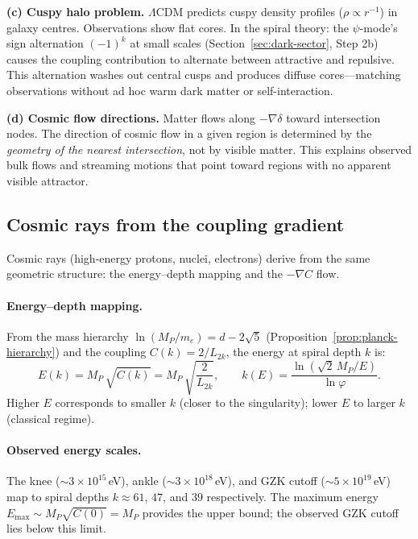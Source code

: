 \documentclass[12pt,a4paper]{article}
\begin{document}
\textbf{(c) Cuspy halo problem.} $\Lambda$CDM predicts cuspy density profiles ($\rho \propto r^{-1}$) in galaxy centres.  Observations show flat cores.  In the spiral theory: the $\psi$-mode's sign alternation $(-1)^k$ at small scales (Section~\ref{sec:dark-sector}, Step 2b) causes the coupling contribution to alternate between attractive and repulsive.  This alternation washes out central cusps and produces diffuse cores---matching observations without ad hoc warm dark matter or self-interaction.

\textbf{(d) Cosmic flow directions.} Matter flows along $-\nabla\delta$ toward intersection nodes. The direction of cosmic flow in a given region is determined by the \emph{geometry of the nearest intersection}, not by visible matter. This explains observed bulk flows and streaming motions that point toward regions with no apparent visible attractor.

\subsection{Cosmic rays from the coupling gradient}
\label{sec:cosmic-rays}

Cosmic rays (high-energy protons, nuclei, electrons) derive from the same geometric structure: the energy--depth mapping and the $-\nabla C$ flow.

\paragraph{Energy--depth mapping.}
From the mass hierarchy $\ln(M_P/m_e) = d - 2\sqrt{5}$ (Proposition~\ref{prop:planck-hierarchy}) and the coupling $C(k) = 2/L_{2k}$, the energy at spiral depth $k$ is:
\begin{equation}
E(k) = M_P\,\sqrt{C(k)} = M_P\,\sqrt{\frac{2}{L_{2k}}}, \qquad k(E) = \frac{\ln(\sqrt{2}\,M_P/E)}{\ln\varphi}.
\end{equation}
Higher $E$ corresponds to smaller $k$ (closer to the singularity); lower $E$ to larger $k$ (classical regime).

\paragraph{Observed energy scales.}
The knee ($\sim 3\times 10^{15}$\,eV), ankle ($\sim 3\times 10^{18}$\,eV), and GZK cutoff ($\sim 5\times 10^{19}$\,eV) map to spiral depths $k \approx 61$, $47$, and $39$ respectively. The maximum energy $E_{\max} \sim M_P\sqrt{C(0)} = M_P$ provides the upper bound; the observed GZK cutoff lies below this limit.
\end{document}
